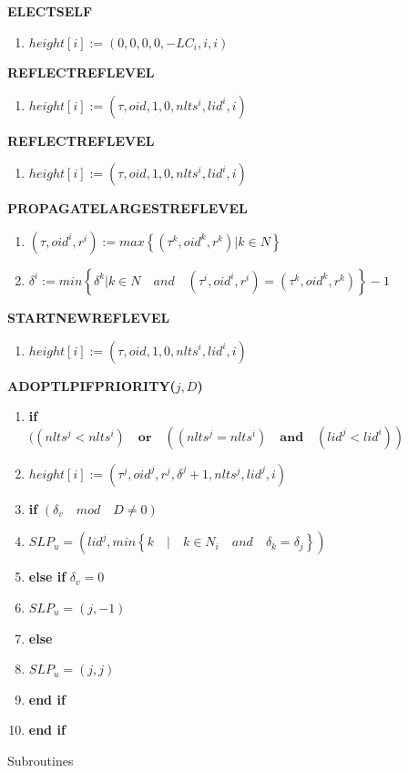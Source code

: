 \documentclass{article}
\begin{document}
\begin{figure}[hbtp]

\textbf{ELECTSELF}
\begin{enumerate}
\item $ height[i] := (0,0,0,0,-LC_{i},i,i) $
\end{enumerate}

\textbf{REFLECTREFLEVEL}
\begin{enumerate}
\item $ height[i] := (\tau ,oid,1,0,nlts^{i},lid^i,i) $
\end{enumerate}


\textbf {REFLECTREFLEVEL}
\begin{enumerate}
\item $ height[i] := (\tau ,oid,1,0,nlts^{i},lid^i,i) $
\end{enumerate}


\textbf{PROPAGATELARGESTREFLEVEL}
\begin{enumerate}
\item $ (\tau , oid^{i}, r^{i}) := max\left\lbrace (\tau ^{k},oid^{k},r^{k}) \vert k\in N\right\rbrace  $
\item $ \delta ^{i} := min \left\lbrace \delta ^{k} \vert k \in N \quad and \quad (\tau ^{i} , oid^{i}, r^{i}) = (\tau ^{k},oid^{k},r^{k})\right\rbrace - 1 $
\end{enumerate}

\textbf {STARTNEWREFLEVEL}
\begin{enumerate}
\item $ height[i] := (\tau ,oid,1,0,nlts^{i},lid^i,i) $
\end{enumerate}

\textbf {ADOPTLPIFPRIORITY($j, D$)}
\begin{enumerate}
\item \textbf{if}$( (nlts^{j}<nlts^{i})\quad \textbf{or} \quad ((nlts^{j}=nlts^{i}) \quad \textbf{and} \quad (lid^{j} < lid^{i}))$
\item  \quad $ height[i] := (\tau ^{j} ,oid^{j},r^{j},\delta ^{j}+1,nlts^{j},lid^j,i) $

\item \quad \textbf{if} $ (\delta _{v} \quad mod \quad D \neq 0) $
\item \quad \quad $ SLP_u = (lid^j, min \left\lbrace k \quad \vert \quad k\in N_i \quad and \quad \delta_k = \delta_j \right\rbrace  )$
\item \quad \textbf{else if } $ \delta_v = 0 $
\item \quad \quad $ SLP_u = (j, -1)$
\item \quad \textbf{else}
\item \quad \quad $ SLP_u = (j, j)$
\item \quad \textbf{end if}
\item \textbf{end if}
\end{enumerate}

\caption{Subroutines}

\end{figure}
\newpage
\end{document}
